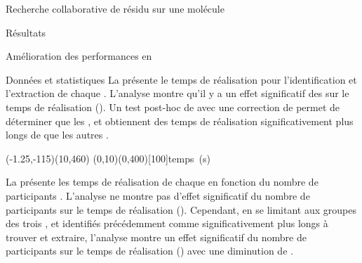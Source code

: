\documentclass[myfrancais,ngerman,english,french]{mythesis}
\begin{document}
\begin{mychapter}{Recherche collaborative de résidu sur une molécule}
\begin{mysection}{Résultats}
\begin{mysubsection}{Amélioration des performances en }
\begin{mysubsubsection}{Données et statistiques}
					La  présente le temps de réalisation  pour l'identification et l'extraction de chaque  .
					L'analyse montre qu'il y a un effet significatif des   sur le temps de réalisation  ().
					Un test post-hoc de  avec une correction de  permet de déterminer que les  ,  et  obtiennent des temps de réalisation significativement plus longs de  que les autres .

					\begin{myfigure}
						\begin{myps}(-1.25,-115)(10,460)
							\myaxes(0,10){}(0,400)[100]{temps~(s)}
						\end{myps}
					\end{myfigure}

					La  présente les temps de réalisation  de chaque   en fonction du nombre de participants .
					L'analyse ne montre pas d'effet significatif du nombre de participants  sur le temps de réalisation  ().
					Cependant, en se limitant aux groupes des trois  ,  et  identifiés précédemment comme significativement plus longs à trouver et extraire, l'analyse montre un effet significatif du nombre de participants  sur le temps de réalisation  () avec une diminution de .


\end{mysubsubsection}
\end{mysubsection}
\end{mysection}
\end{mychapter}
\end{document}
